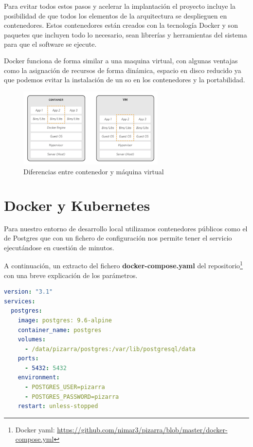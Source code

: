 \documentclass[11pt,spanish,listoffigures,listoftables]{tfgetsinf}
\begin{document}
Para evitar todos estos pasos y acelerar la implantación el proyecto incluye la posibilidad de que todos los elementos de la arquitectura se desplieguen en \Gls{contenedor}es. Estos \Gls{contenedor}es están creados con la tecnología Docker y son paquetes que incluyen todo lo necesario, sean librerías y herramientas del sistema para que el software se ejecute.

Docker funciona de forma similar a una maquina virtual, con algunas ventajas como la asignación de recursos de forma dinámica, espacio en disco reducido ya que podemos evitar la instalación de un \acrshort{so} en los contenedores y la portabilidad.


\begin{figure}[ht]
	\centering
	\includegraphics[width=0.65\textwidth]{img/container-vs-vm}
	\caption[Diferencias entre contenedor Docker y máquina virtual]{Diferencias entre contenedor y máquina virtual}
	\label{figura:container-vs-vm}
\end{figure}

\section{Docker y Kubernetes}

Para nuestro entorno de desarrollo local utilizamos contenedores públicos como el de Postgres que con un fichero de configuración nos permite tener el servicio ejecutándose en cuestión de minutos.

A continuación, un extracto del fichero \textbf{docker-compose.yaml} del repositorio\footnote{Docker yaml: \url{https://github.com/nimar3/pizarra/blob/master/docker-compose.yml}} con una breve explicación de los parámetros.

\begin{lstlisting}[language=yaml]
version: "3.1"
services:
  postgres:
    image: postgres: 9.6-alpine
    container_name: postgres
    volumes:
      - /data/pizarra/postgres:/var/lib/postgresql/data
    ports:
      - 5432: 5432
    environment:
      - POSTGRES_USER=pizarra
      - POSTGRES_PASSWORD=pizarra
    restart: unless-stopped
\end{lstlisting}
\end{document}
